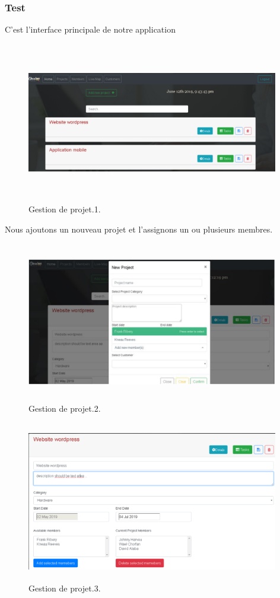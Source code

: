 \subsubsection{Test}
C'est l'interface principale de notre application
\FloatBarrier
\begin{figure}[H]
\center
\includegraphics[width=11cm,height=7cm]{./figures/pres/gp1.png}
\caption{Gestion de projet.1.}
\end{figure}
\FloatBarrier

Nous ajoutons un nouveau projet et l'assignons un ou plusieurs membres.
\FloatBarrier
\begin{figure}[H]
\center
\includegraphics[width=11cm,height=7cm]{./figures/pres/gp2.png}
\caption{Gestion de projet.2.}
\end{figure}
\FloatBarrier

\FloatBarrier
\begin{figure}[H]
\center
\includegraphics[width=11cm,height=7cm]{./figures/pres/gp3.png}
\caption{Gestion de projet.3.}
\end{figure}
\FloatBarrier

